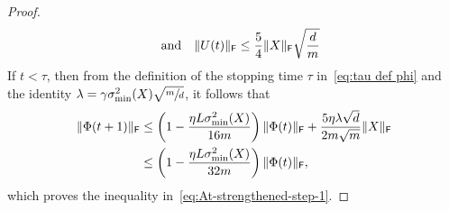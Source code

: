 \begin{proof}
\[      \quad \text{and} \quad
      \lVert U(t)\rVert_{\mathsf{F}} \leq \frac{5}{4} \lVert X\rVert_{\mathsf{F}} \sqrt{\frac{d}{m}}
    \]
    If $t < \tau$, then from the definition of the stopping time $\tau$ in~\eqref{eq:tau def phi} and the identity $\lambda = \gamma\sigma_{\min}^2(X) \sqrt{\sfrac{m}{d}}$,
    it follows that
    \begin{align*}
      \lVert\Phi(t+1)\rVert_{\mathsf{F}}  &\leq
      \left(1 - \frac{\eta L \sigma_{\min}^2(X)}{16 m}\right) \lVert\Phi(t)\rVert_{\mathsf{F}}  +
      \frac{5 \eta \lambda \sqrt{d}}{2m \sqrt{m}} \lVert X\rVert_{\mathsf{F}} \\
      &\leq
      \left(1 - \frac{\eta L \sigma_{\min}^2(X)}{32 m}\right) \lVert\Phi(t)\rVert_{\mathsf{F}},
     \end{align*}
    which proves the inequality in~\eqref{eq:At-strengthened-step-1}.
\end{proof}


